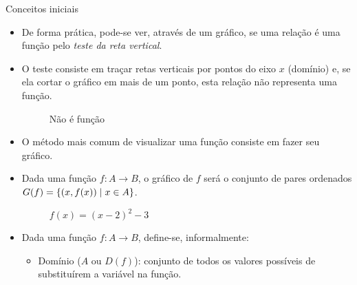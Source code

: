 \begin{frame}[allowframebreaks]{Conceitos iniciais}
\begin{itemize}
    \skipframe

    \item De forma prática, pode-se ver, através de um gráfico, se uma relação é uma função pelo \emph{teste da reta vertical}.

    \item O teste consiste em traçar retas verticais por pontos do eixo $x$ (domínio) e, se ela cortar o gráfico em mais de um ponto, esta relação não representa uma função.

    \skipframe

    \begin{figure}
        \centering
        \caption{Não é função}
    \end{figure}

    \skipframe

    \item O método mais comum de visualizar uma função consiste em fazer seu gráfico. 

    \item Dada uma função $f:A \rightarrow B$, o gráfico de $f$ será o conjunto de pares ordenados $G(f) = \left\{ (x, f(x)) \mid x \in A \right\}$.

    \skipframe

    \begin{figure}
        \centering
        \caption{$f(x) = (x - 2)^2 - 3$}
    \end{figure}

    \skipframe

    \item Dada uma função $f:A \rightarrow B$, define-se, informalmente:

    \begin{itemize}
         \item Domínio ($A$ ou $D(f)$): conjunto de todos os valores possíveis de substituírem a variável na função. 


\end{itemize}
\end{itemize}
\end{frame}
